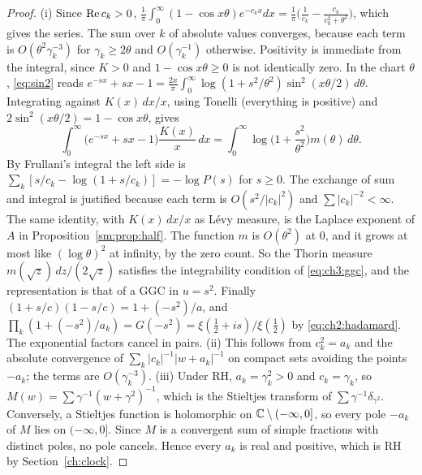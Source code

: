 \begin{proof}
(i) Since $\operatorname{Re} c_k>0$, $\frac1\pi\int_0^\infty(1-\cos x\theta)e^{-c_kx}dx=\frac1\pi\big(\frac1{c_k}-\frac{c_k}{c_k^2+\theta^2}\big)$, which gives the series. The sum over $k$ of absolute values converges, because each term is $O(\theta^2\gamma_k^{-3})$ for $\gamma_k\ge2\theta$ and $O(\gamma_k^{-1})$ otherwise. Positivity is immediate from the integral, since $K>0$ and $1-\cos x\theta\ge0$ is not identically zero. In the chart $\theta$, \eqref{eq:sin2} reads $e^{-sx}+sx-1=\frac{2x}\pi\int_0^\infty\log(1+s^2/\theta^2)\sin^2(x\theta/2)\,d\theta$. Integrating against $K(x)\,dx/x$, using Tonelli (everything is positive) and $2\sin^2(x\theta/2)=1-\cos x\theta$, gives
\[
\int_0^\infty\big(e^{-sx}+sx-1\big)\frac{K(x)}x\,dx=\int_0^\infty\log\Big(1+\frac{s^2}{\theta^2}\Big)m(\theta)\,d\theta .
\]
By Frullani's integral the left side is $\sum_k[s/c_k-\log(1+s/c_k)]=-\log P(s)$ for $s\ge0$. The exchange of sum and integral is justified because each term is $O(s^2/|c_k|^2)$ and $\sum|c_k|^{-2}<\infty$. The same identity, with $K(x)\,dx/x$ as L\'evy measure, is the Laplace exponent of $A$ in Proposition~\ref{sm:prop:half}. The function $m$ is $O(\theta^2)$ at $0$, and it grows at most like $(\log\theta)^2$ at infinity, by the zero count. So the Thorin measure $m(\sqrt z)\,dz/(2\sqrt z)$ satisfies the integrability condition of \eqref{eq:ch3:ggc}, and the representation is that of a GGC in $u=s^2$. Finally $(1+s/c)(1-s/c)=1+(-s^2)/a$, and $\prod_k(1+(-s^2)/a_k)=G(-s^2)=\xi(\frac12+is)/\xi(\frac12)$ by \eqref{eq:ch2:hadamard}. The exponential factors cancel in pairs.
(ii) This follows from $c_k^2=a_k$ and the absolute convergence of $\sum_k|c_k|^{-1}|w+a_k|^{-1}$ on compact sets avoiding the points $-a_k$; the terms are $O(\gamma_k^{-3})$.
(iii) Under RH, $a_k=\gamma_k^2>0$ and $c_k=\gamma_k$, so $M(w)=\sum\gamma^{-1}(w+\gamma^2)^{-1}$, which is the Stieltjes transform of $\sum\gamma^{-1}\delta_{\gamma^2}$. Conversely, a Stieltjes function is holomorphic on $\mathbb{C}\setminus(-\infty,0]$, so every pole $-a_k$ of $M$ lies on $(-\infty,0]$. Since $M$ is a convergent sum of simple fractions with distinct poles, no pole cancels. Hence every $a_k$ is real and positive, which is RH by Section~\ref{ch:clock}.
\end{proof}

